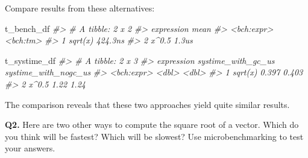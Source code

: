 \documentclass[
]{book}
\newenvironment{Shaded}{\begin{snugshade}}{\end{snugshade}}
\newcommand{\AttributeTok}[1]{\textcolor[rgb]{0.77,0.63,0.00}{#1}}
\newcommand{\CommentTok}[1]{\textcolor[rgb]{0.56,0.35,0.01}{\textit{#1}}}
\newcommand{\FloatTok}[1]{\textcolor[rgb]{0.00,0.00,0.81}{#1}}
\newcommand{\FunctionTok}[1]{\textcolor[rgb]{0.00,0.00,0.00}{#1}}
\newcommand{\NormalTok}[1]{#1}
\newcommand{\OtherTok}[1]{\textcolor[rgb]{0.56,0.35,0.01}{#1}}
\newcommand{\SpecialCharTok}[1]{\textcolor[rgb]{0.00,0.00,0.00}{#1}}
\newcommand{\StringTok}[1]{\textcolor[rgb]{0.31,0.60,0.02}{#1}}
\begin{document}
\begin{Shaded}
\end{Shaded}

Compare results from these alternatives:

\begin{Shaded}
\begin{Highlighting}[]
\NormalTok{t\_bench\_df}
\CommentTok{\#\textgreater{} \# A tibble: 2 x 2}
\CommentTok{\#\textgreater{}   expression     mean}
\CommentTok{\#\textgreater{}   \textless{}bch:expr\textgreater{} \textless{}bch:tm\textgreater{}}
\CommentTok{\#\textgreater{} 1 sqrt(x)     424.3ns}
\CommentTok{\#\textgreater{} 2 x\^{}0.5         1.3us}

\NormalTok{t\_systime\_df}
\CommentTok{\#\textgreater{} \# A tibble: 2 x 3}
\CommentTok{\#\textgreater{}   expression systime\_with\_gc\_us systime\_with\_nogc\_us}
\CommentTok{\#\textgreater{}   \textless{}bch:expr\textgreater{}              \textless{}dbl\textgreater{}                \textless{}dbl\textgreater{}}
\CommentTok{\#\textgreater{} 1 sqrt(x)                 0.397                0.403}
\CommentTok{\#\textgreater{} 2 x\^{}0.5                   1.22                 1.24}
\end{Highlighting}
\end{Shaded}

The comparison reveals that these two approaches yield quite similar results.

\textbf{Q2.} Here are two other ways to compute the square root of a vector. Which
do you think will be fastest? Which will be slowest? Use microbenchmarking
to test your answers.
\end{document}
